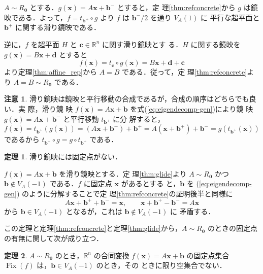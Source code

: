 \documentclass[11pt, uplatex, dvipdfmx, titlepage]{jsarticle}
\makeatletter
\DeclareMathOperator{\Fix}{Fix}
\renewenvironment{proof}[1][\proofname]{\par
  \pushQED{\qed}%
  \normalfont \topsep6\p@\@plus6\p@\relax
  \trivlist
  \item[\hskip\labelsep
         \bfseries
    {#1}]\ignorespaces
}{%
  \popQED\endtrivlist\@endpefalse
}
\theoremstyle{definition}
\newtheorem{theorem}{定理}[section]
\renewcommand{\proofname}{\textbf{証明}}
\newtheorem*{remark}{注意}
\makeatother
\begin{document}
\begin{proof}
  $A \sim R_{\bm{0}}$ とする．$g(\bm{x}) = A\bm{x} + \bm{b}^{-}$ とすると，定
  理\ref{thm:refconcrete}から $g$ は鏡映である．よって，$f =
  t_{\bm{b}^{+}} \circ g$ より $f$ は $\bm{b}^{-}/2$ を通り $V_A(1)$ に
  平行な超平面と $\bm{b}^{+}$ に関する滑り鏡映である．

  逆に，$f$ を超平面 $H$ と $\bm{c} \in \mathbb{R}^n$ に関す滑り鏡映とす
  る．$H$ に関する鏡映を $g(\bm{x}) = B\bm{x} + \bm{d}$ とすると
  \[
    f(\bm{x}) = t_{\bm{c}}\circ g(\bm{x}) = B\bm{x} + \bm{d} + \bm{c}
  \]
  より定理\ref{thm:affine_rep}から $A=B$ である．従って，定
  理\ref{thm:refconcrete}より $A =B\sim R_{\bm{0}}$ である．
\end{proof}

\begin{remark}
  滑り鏡映は鏡映と平行移動の合成であるが，合成の順序はどちらでも良い．実
  際，滑り鏡
  映 $f(\bm{x})=A\bm{x}+\bm{b}$ を式(\ref{eq:eigendecomp-gen})により鏡
  映 $g(\bm{x}) = A\bm{x} + \bm{b}^{-}$ と平行移動 $t_{\bm{b}^{+}}$ に分
  解すると，
  \[
    f(\bm{x}) = t_{\bm{b}^{+}} \left( g(\bm{x}) \right)= \left(A\bm{x} + \bm{b}^{-}\right) + \bm{b}^{+}
    = A\left(\bm{x}+\bm{b}^{+}\right) + \bm{b}^{-} = g\left( t_{\bm{b}^{+}}(\bm{x})\right) 
  \]
  であるから $t_{\bm{b}^{+}} \circ g = g \circ t_{\bm{b}^{+}}$ である．
\end{remark}

\begin{theorem}\label{thm:inv-glide}
  滑り鏡映には固定点がない．
\end{theorem}
\begin{proof}
  $f(\bm{x}) = A\bm{x} + \bm{b}$ を滑り鏡映とする．定
  理\ref{thm:glide}より $A \sim R_{\bm{0}}$ かつ $\bm{b} \notin
  V_A(-1)$ である．$f$ に固定点 $\bm{x}$ があるとする
  と，$\bm{b}$ を (\ref{eq:eigendecomp-gen}) のように分解することで定
  理\ref{thm:refconcrete}の証明後半と同様に
  \[
    A\bm{x} + \bm{b}^+ + \bm{b}^- =\bm{x}, \qquad \bm{x} + \bm{b}^+ - \bm{b}^- = A\bm{x}
  \]
  から $\bm{b} \in V_A(-1)$ となるが，これは $\bm{b} \notin V_A(-1)$ に
  矛盾する．
\end{proof}

この定理と定理\ref{thm:refconcrete}と定理\ref{thm:glide}から，$A\sim R_{\bm{0}}$ のときの固定点の有無に関して次が成り立つ．
\begin{theorem}\label{thm:R0-fixed}
  $A \sim R_{\bm{0}}$ のとき，$\mathbb{R}^n$ の合同変換
  $f(\bm{x}) = A\bm{x} + \bm{b}$ の固定点集合 $\Fix(f)$ は，$\bm{b} \in V_A(-1)$ のとき，その
  ときに限り空集合でない．
\end{theorem}
\end{document}
